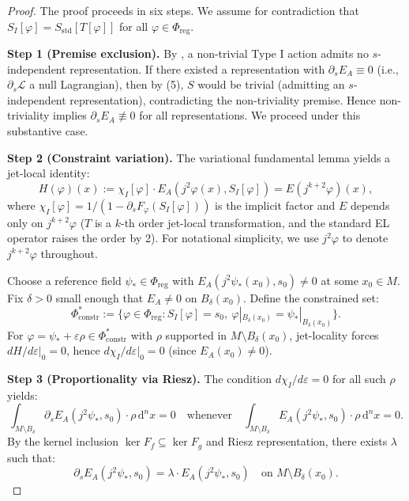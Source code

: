 \documentclass[12pt,letterpaper]{article}
\theoremstyle{definition}
\newcommand{\mL}{\mathcal{L}}
\newcommand{\mPhi}{\Phi}
\newcommand{\mreg}{\mPhi_{\mathrm{reg}}}
\newcommand{\diff}{\mathrm{d}}
\newcommand{\eps}{\varepsilon}
\newcommand{\chiI}{\chi_I}
\newcommand{\EA}{E_A}
\newcommand{\jphi}{j^2\varphi}
\newcommand{\dVol}{\,\diff^n x}
\begin{document}
\begin{proof}
The proof proceeds in six steps. We assume for contradiction that $S_I[\varphi] = S_{\mathrm{std}}[T[\varphi]]$ for all $\varphi \in \mreg$.

\textbf{Step 1 (Premise exclusion).} By , a non-trivial Type I action admits no $s$-independent representation. If there existed a representation with $\partial_s E_A \equiv 0$ (i.e., $\partial_s \mL$ a null Lagrangian), then by  (5), $S$ would be trivial (admitting an $s$-independent representation), contradicting the non-triviality premise. Hence non-triviality implies $\partial_s E_A \not\equiv 0$ for all representations. We proceed under this substantive case.

\textbf{Step 2 (Constraint variation).} The variational fundamental lemma yields a jet-local identity:
\begin{equation}
H(\varphi)(x) := \chiI[\varphi] \cdot \EA(\jphi(x), S_I[\varphi]) = E(j^{k+2}\varphi)(x),
\label{eq:jet-local-claim}
\end{equation}
where $\chiI[\varphi] = 1/(1 - \partial_s F_\varphi(S_I[\varphi]))$ is the implicit factor and $E$ depends only on $j^{k+2}\varphi$ ($T$ is a $k$-th order jet-local transformation, and the standard EL operator raises the order by 2). For notational simplicity, we use $\jphi$ to denote $j^{k+2}\varphi$ throughout.

Choose a reference field $\psi_* \in \mreg$ with $\EA(j^2\psi_*(x_0), s_0) \neq 0$ at some $x_0 \in M$. Fix $\delta > 0$ small enough that $\EA \neq 0$ on $B_\delta(x_0)$. Define the constrained set:
\[ \Phi^*_{\mathrm{constr}} := \{\varphi \in \mreg : S_I[\varphi] = s_0,\ \varphi|_{B_\delta(x_0)} = \psi_*|_{B_\delta(x_0)}\}. \]
For $\varphi = \psi_* + \eps\rho \in \Phi^*_{\mathrm{constr}}$ with $\rho$ supported in $M \setminus B_\delta(x_0)$, jet-locality forces $dH/d\eps|_0 = 0$, hence $d\chiI/d\eps|_0 = 0$ (since $\EA(x_0) \neq 0$).

\textbf{Step 3 (Proportionality via Riesz).} The condition $d\chiI/d\eps = 0$ for all such $\rho$ yields:
\[ \int_{M \setminus B_\delta} \partial_s \EA(j^2\psi_*, s_0) \cdot \rho \dVol = 0 \quad \text{whenever} \quad \int_{M \setminus B_\delta} \EA(j^2\psi_*, s_0) \cdot \rho \dVol = 0. \]
By the kernel inclusion $\ker F_f \subseteq \ker F_g$ and Riesz representation, there exists $\lambda$ such that:
\begin{equation}
\partial_s \EA(j^2\psi_*, s_0) = \lambda \cdot \EA(j^2\psi_*, s_0) \quad \text{on } M \setminus B_\delta(x_0).
\label{eq:proportionality-local}
\end{equation}


\end{proof}
\end{document}
